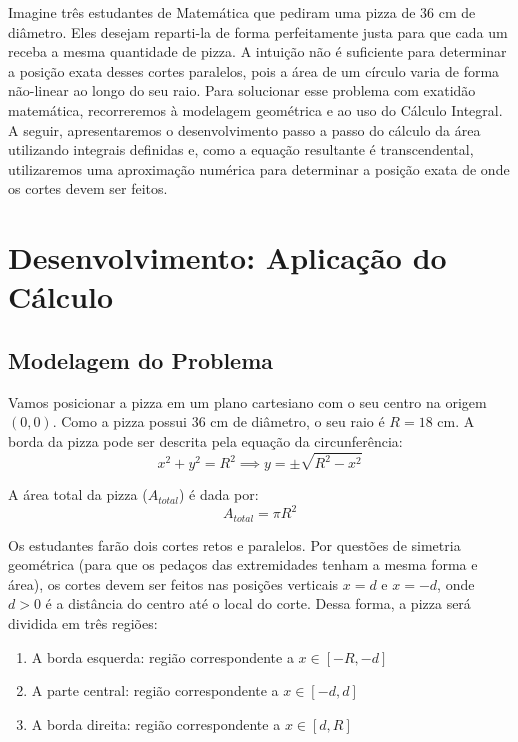 \documentclass[12pt,a4paper]{article}
\begin{document}
Imagine tr\^es estudantes de Matem\'atica que pediram uma pizza de $36\text{ cm}$ de di\^ametro. Eles desejam reparti-la de forma perfeitamente justa para que cada um receba a mesma quantidade de pizza. A intui\c{c}\~ao n\~ao \'e suficiente para determinar a posi\c{c}\~ao exata desses cortes paralelos, pois a \'area de um c\'irculo varia de forma n\~ao-linear ao longo do seu raio. Para solucionar esse problema com exatid\~ao matem\'atica, recorreremos \`a modelagem geom\'etrica e ao uso do C\'alculo Integral. A seguir, apresentaremos o desenvolvimento passo a passo do c\'alculo da \'area utilizando integrais definidas e, como a equa\c{c}\~ao resultante \'e transcendental, utilizaremos uma aproxima\c{c}\~ao num\'erica para determinar a posi\c{c}\~ao exata de onde os cortes devem ser feitos.

\section{Desenvolvimento: Aplica\c{c}\~ao do C\'alculo}

\subsection{Modelagem do Problema}
Vamos posicionar a pizza em um plano cartesiano com o seu centro na origem $(0, 0)$. Como a pizza possui $36\text{ cm}$ de di\^ametro, o seu raio \'e $R = 18\text{ cm}$. A borda da pizza pode ser descrita pela equa\c{c}\~ao da circunfer\^encia:
\begin{equation}
x^2 + y^2 = R^2 \implies y = \pm \sqrt{R^2 - x^2}
\end{equation}

A \'area total da pizza ($A_{total}$) \'e dada por:
\begin{equation}
A_{total} = \pi R^2
\end{equation}

Os estudantes far\~ao dois cortes retos e paralelos. Por quest\~oes de simetria geom\'etrica (para que os peda\c{c}os das extremidades tenham a mesma forma e \'area), os cortes devem ser feitos nas posi\c{c}\~oes verticais $x = d$ e $x = -d$, onde $d > 0$ \'e a dist\^ancia do centro at\'e o local do corte. Dessa forma, a pizza ser\'a dividida em tr\^es regi\~oes:
\begin{enumerate}
    \item A borda esquerda: regi\~ao correspondente a $x \in [-R, -d]$
    \item A parte central: regi\~ao correspondente a $x \in [-d, d]$
    \item A borda direita: regi\~ao correspondente a $x \in [d, R]$
\end{enumerate}
\end{document}

